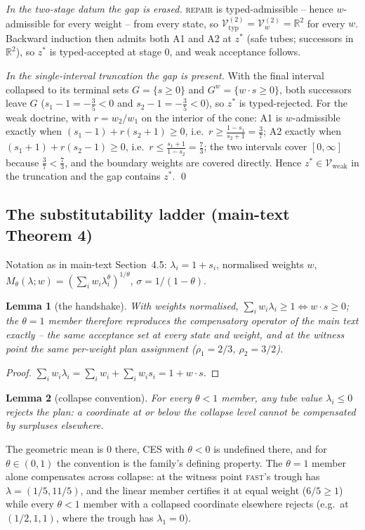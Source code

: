 \documentclass[preprint,11pt,authoryear]{elsarticle}
\newtheorem{lemma}{Lemma}
\theoremstyle{remark}
\newcommand{\Vweak}{\mathcal{V}_{\mathrm{weak}}}
\newcommand{\act}[1]{\textsc{#1}}
\begin{document}
\emph{In the two-stage datum the gap is erased.} \act{repair} is typed-admissible -- hence $w$-admissible for every weight -- from every state, so $\mathcal V^{(2)}_{\mathrm{typ}}=\mathcal V^{(2)}_w=\mathbb R^2$ for every $w$. Backward induction then admits both A1 and A2 at $z^*$ (safe tubes; successors in $\mathbb R^2$), so $z^*$ is typed-accepted at stage 0, and weak acceptance follows.

\emph{In the single-interval truncation the gap is present.} With the final interval collapsed to its terminal sets $G=\{s\ge0\}$ and $G^w=\{w\cdot s\ge0\}$, both successors leave $G$ ($s_1-1=-\tfrac35<0$ and $s_2-1=-\tfrac35<0$), so $z^*$ is typed-rejected. For the weak doctrine, with $r=w_2/w_1$ on the interior of the cone: A1 is $w$-admissible exactly when $(s_1-1)+r(s_2+1)\ge0$, i.e.\ $r\ge\tfrac{1-s_1}{s_2+1}=\tfrac37$; A2 exactly when $(s_1+1)+r(s_2-1)\ge0$, i.e.\ $r\le\tfrac{s_1+1}{1-s_2}=\tfrac73$; the two intervals cover $[0,\infty]$ because $\tfrac37<\tfrac73$, and the boundary weights are covered directly. Hence $z^*\in\Vweak$ in the truncation and the gap contains $z^*$. \qed

\subsection{The substitutability ladder (main-text Theorem 4)}\label{si:ladderproofs}

Notation as in main-text Section~4.5: $\lambda_i=1+s_i$, normalised weights $w$, $M_\theta(\lambda;w)=(\sum_iw_i\lambda_i^\theta)^{1/\theta}$, $\sigma=1/(1-\theta)$.

\begin{lemma}[the handshake]\label{lem:handshake}
With weights normalised, $\sum_iw_i\lambda_i\ge1\iff w\cdot s\ge0$; the $\theta=1$ member therefore reproduces the compensatory operator of the main text exactly -- the same acceptance set at every state and weight, and at the witness point the same per-weight plan assignment ($\rho_1=2/3$, $\rho_2=3/2$).
\end{lemma}
\begin{proof}
$\sum_iw_i\lambda_i=\sum_iw_i+\sum_iw_is_i=1+w\cdot s$.
\end{proof}

\begin{lemma}[collapse convention]\label{lem:collapse}
For every $\theta<1$ member, any tube value $\lambda_i\le0$ rejects the plan: a coordinate at or below the collapse level cannot be compensated by surpluses elsewhere.
\end{lemma}
\noindent The geometric mean is $0$ there, CES with $\theta<0$ is undefined there, and for $\theta\in(0,1)$ the convention is the family's defining property. The $\theta=1$ member alone compensates across collapse: at the witness point \act{fast}'s trough has $\lambda=(1/5,11/5)$, and the linear member certifies it at equal weight ($6/5\ge1$) while every $\theta<1$ member with a collapsed coordinate elsewhere rejects (e.g.\ at $(1/2,1,1)$, where the trough has $\lambda_1=0$).
\end{document}
